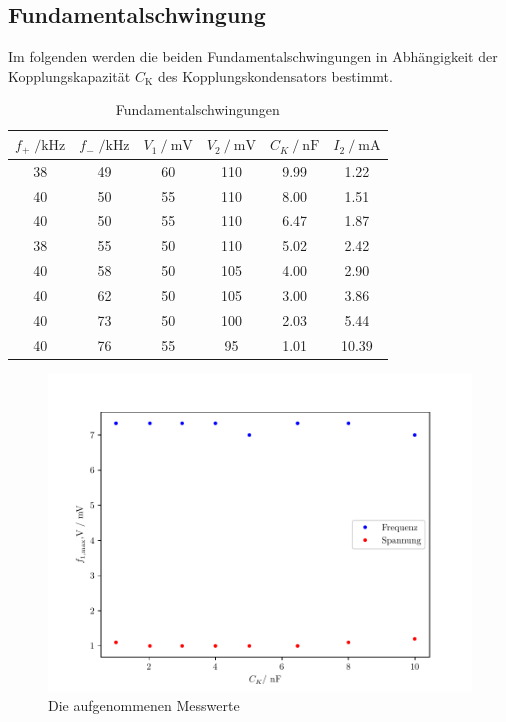 \subsection{Fundamentalschwingung}
Im folgenden werden die beiden Fundamentalschwingungen in Abhängigkeit der Kopplungskapazität $C_{\text{K}}$ des Kopplungskondensators
bestimmt. 


\begin{table}
  \centering
  \caption{Fundamentalschwingungen}
  \label{tab:aufgabeC}
  \begin{tabular}{c c c c c c}
      \toprule
      {$f_+\;/ \si{\kilo\hertz}$} & {$f_-\;/ \si{\kilo\hertz}$} & {$V_1 \:/\: \si{\milli\volt}$} & {$V_2 \:/\: \si{\milli\volt}$} & {$C_K \:/\: \si{\nano\farad}$} & $I_2 \:/\:\si{\milli\ampere}$ \\
      \midrule
      38 & 49 & 60 & 110 & 9.99 & 1.22 \\
      40 & 50 & 55 & 110 & 8.00 & 1.51 \\
      40 & 50 & 55 & 110 & 6.47 & 1.87 \\
      38 & 55 & 50 & 110 & 5.02 & 2.42 \\
      40 & 58 & 50 & 105 & 4.00 & 2.90 \\
      40 & 62 & 50 & 105 & 3.00 & 3.86 \\
      40 & 73 & 50 & 100 & 2.03 & 5.44 \\
      40 & 76 & 55 & 95 & 1.01 & 10.39 \\
      \bottomrule
  \end{tabular}
\end{table}


\begin{figure}
  \centering
  \includegraphics{freq1.pdf}
  \caption{Die aufgenommenen Messwerte}
  \label{fig:freq1}
\end{figure}

